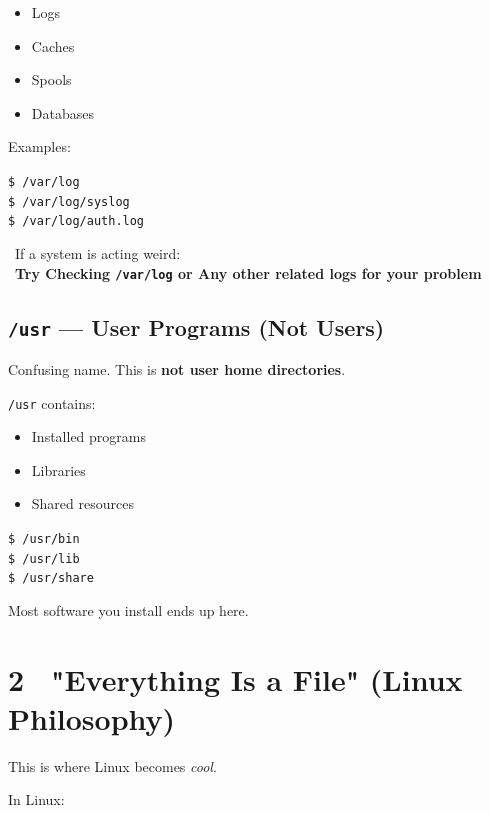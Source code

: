 \documentclass[12pt]{article}
\newcommand{\fileicon}{\faFile}
\newcommand{\handicon}{\faHandPointRight}
\begin{document}
\begin{itemize}
    \item Logs
    \item Caches
    \item Spools
    \item Databases
\end{itemize}

Examples:

\begin{highlightbox}
\texttt{\$ /var/log}\\
\texttt{\$ /var/log/syslog}\\
\texttt{\$ /var/log/auth.log}
\end{highlightbox}

\begin{infobox}
\handicon\ If a system is acting weird:\\
\handicon\ \textbf{Try Checking \texttt{/var/log} or Any other related logs for your problem}
\end{infobox}

\subsection*{\texttt{/usr} — User Programs (Not Users)}

Confusing name.
This is \textbf{not user home directories}.

\texttt{/usr} contains:

\begin{itemize}
    \item Installed programs
    \item Libraries
    \item Shared resources
\end{itemize}

\begin{highlightbox}
\texttt{\$ /usr/bin}\\
\texttt{\$ /usr/lib}\\
\texttt{\$ /usr/share}
\end{highlightbox}

Most software you install ends up here.

\section*{2 \fileicon\ "Everything Is a File" (Linux Philosophy)}

This is where Linux becomes \textit{cool}.

In Linux:
\end{document}
